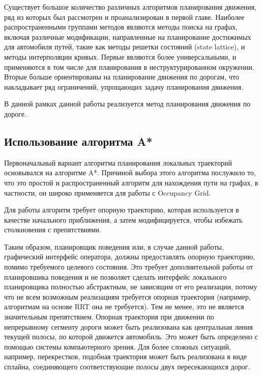 Существует большое количество различных алгоритмов планирования движения, ряд из которых был рассмотрен и проанализирован
в первой главе. Наиболее распространенными группами методов являются методы поиска на графах, включая различные
модификации, направленные на планирование достижимых для автомобиля путей, такие как методы решетки состояний
(state lattice), и методы интерполяции кривых. Первые являются более универсальными, и применяются в том числе для
планирования в неструктурированном окружении. Вторые больше ориентированы на планирование движения по дорогам, что
накладывает ряд ограничений, упрощающих задачу планирования движения.

В данной рамках данной работы реализуется метод планирования движения по дороге.

\subsection{Использование алгоритма A*}
Первоначальный вариант алгоритма планирования локальных траекторий основывался на алгоритме A*. Причиной
выбора этого алгоритма послужило то, что это простой  и распространенный алгоритм для нахождения пути
на графах, в частности, он широко применяется для работы с Occupancy Grid.

Для работы алгоритм требует опорную траекторию, которая используется в качестве начального приближения, а затем
модифицируется, чтобы избежать столкновения с препятствиями.

Таким образом, планировщик поведения или, в случае данной работы, графический интерфейс оператора, должны предоставлять
опорную траекторию, помимо требуемого целевого состояния. Это требует дополнительной работы от планировшика поведения
и не позволяет сделать интерфейс локального планировщика полностью абстрактным, не зависящим от его реализации, потому
что не всем возможным реализациям требуется опорная траектория (например, алгоритмам на основе RRT она не требуется).
Тем не менее, это не является значительным препятствием. Опорная траектория при движении по непрерывному сегменту дороги
может быть реализована как центральная линия текущей полосы, по которой движется автомобиль. Это может быть определено
с помощью системы компьютерного зрения. Для более сложных ситуаций, например, перекрестков, подобная траектория может
быть реализована в виде сплайна, соединяющего соответствующие полосы двух пересекающихся дорог.


